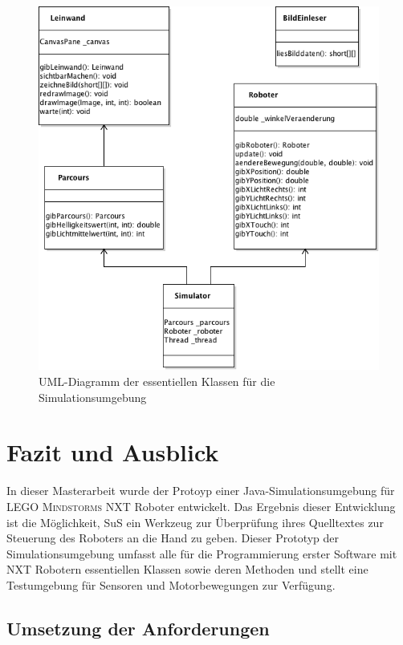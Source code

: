\documentclass[paper=a4, DIV=calc, BCOR=15mm, twoside=on, onecolumn=on, open = right, titlepage =on, parskip =half, headsepline = on, footsepline = on, chapterprefix = off, appendixprefix = off, fontsize = 12pt, numbers = noenddot, abstract = on]{scrbook}
\begin{document}
\begin{figure}[htbp]
\centering
\includegraphics[scale=0.7]{images/uml_simulator_essenz.png}
\caption{UML-Diagramm der essentiellen Klassen für die Simulationsumgebung}
\label{fig:simulator_uml}
\end{figure}


\newpage
\chapter{Fazit und Ausblick}

\onehalfspacing

In dieser Masterarbeit wurde der Protoyp einer Java-Simulationsumgebung für \textsc{LEGO Mindstorms} NXT Roboter entwickelt. Das Ergebnis dieser Entwicklung ist die Möglichkeit, SuS ein Werkzeug zur Überprüfung ihres Quelltextes zur Steuerung des Roboters an die Hand
zu geben. Dieser Prototyp der Simulationsumgebung umfasst alle für die
Programmierung erster Software mit NXT Robotern essentiellen Klassen sowie deren Methoden und stellt eine Testumgebung für Sensoren und Motorbewegungen zur Verfügung.


\section{Umsetzung der Anforderungen}
\end{document}
